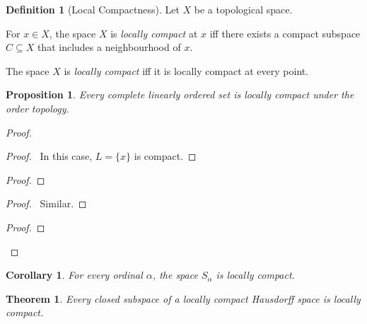 \documentclass{report}
\let\qed\relax
\newtheorem{prop}[lm]{Proposition}
\newtheorem{thm}[lm]{Theorem}
\newtheorem{cor}{Corollary}[lm]
\theoremstyle{definition}
\newtheorem{df}[lm]{Definition}
\begin{document}
  \begin{df}[Local Compactness]
    Let $X$ be a topological space.

    For $x \in X$, the space $X$ is \emph{locally compact} at $x$ iff there
    exists a compact subspace $C \subseteq X$ that includes a neighbourhood of
    $x$.

    The space $X$ is \emph{locally compact} iff it is locally compact at every
    point.
  \end{df}

   \begin{prop}
  Every complete linearly ordered set is locally compact under the order
  topology.
 \end{prop}

 \begin{proof}
  \pf
\begin{proof}
  \pf\ In this case, $L = \{ x \}$ is compact.
\end{proof}
\begin{proof}
  \step{<2>2}{Take $C = [a,x]$ and $U = (a, x]$}
\end{proof}
  \begin{proof}
    \pf\ Similar.
  \end{proof}
  \begin{proof}
  \end{proof}
  \qed
 \end{proof}

 \begin{cor}
  For every ordinal $\alpha$, the space $S_\alpha$ is locally compact.
 \end{cor}


  \begin{thm}
    Every closed subspace of a locally compact Hausdorff space is locally
    compact.
  \end{thm}
\end{document}
